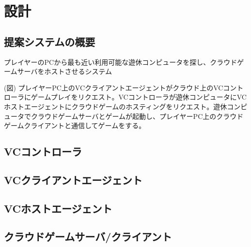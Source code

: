 \section{設計}

\subsection{提案システムの概要}
プレイヤーのPCから最も近い利用可能な遊休コンピュータを探し、クラウドゲームサーバをホストさせるシステム

(図)
プレイヤーPC上のVCクライアントエージェントがクラウド上のVCコントローラにゲームプレイをリクエスト。VCコントローラが遊休コンピュータにVCホストエージェントにクラウドゲームのホスティングをリクエスト。遊休コンピュータでクラウドゲームサーバとゲームが起動し、プレイヤーPC上のクラウドゲームクライアントと通信してゲームをする。

\subsection{VCコントローラ}

\subsection{VCクライアントエージェント}

\subsection{VCホストエージェント}

\subsection{クラウドゲームサーバ/クライアント}
